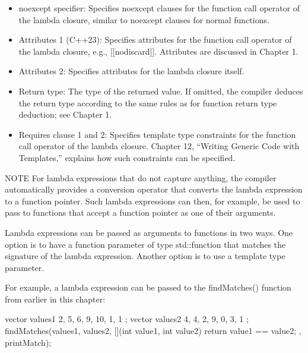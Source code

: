 \begin{itemize}
\item
noexcept specifier: Specifies noexcept clauses for the function call operator of the lambda closure, similar to noexcept clauses for normal functions.


\item
Attributes 1 (C++23): Specifies attributes for the function call operator of the lambda closure, e.g., [[nodiscard]]. Attributes are discussed in Chapter 1.

\item
Attributes 2: Specifies attributes for the lambda closure itself.

\item
Return type: The type of the returned value. If omitted, the compiler deduces the return type according to the same rules as for function return type deduction; see Chapter 1.

\item
Requires clause 1 and 2: Specifies template type constraints for the function call operator of the lambda closure. Chapter 12, “Writing Generic Code with Templates,” explains how such constraints can be specified.
\end{itemize}

\begin{myNotic}{NOTE}
For lambda expressions that do not capture anything, the compiler automatically provides a conversion operator that converts the lambda expression to a function pointer. Such lambda expressions can then, for example, be used to pass to functions that accept a function pointer as one of their arguments.
\end{myNotic}


Lambda expressions can be passed as arguments to functions in two ways. One option is to have a function parameter of type std::function that matches the signature of the lambda expression. Another option is to use a template type parameter.

For example, a lambda expression can be passed to the findMatches() function from earlier in this chapter:

\begin{cpp}
vector values1 { 2, 5, 6, 9, 10, 1, 1 };
vector values2 { 4, 4, 2, 9, 0, 3, 1 };
findMatches(values1, values2,
    [](int value1, int value2) { return value1 == value2; },
    printMatch);
\end{cpp}

